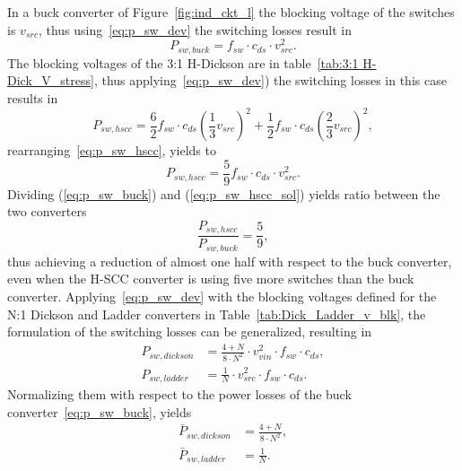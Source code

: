In a buck converter of Figure~\ref{fig:ind_ckt_l} the blocking voltage of the switches is $v_{src}$, thus using~\eqref{eq:p_sw_dev} the switching losses result in
\begin{equation}
P_{sw,buck} =   f_{sw} \cdot c_{ds} \cdot v_{src}^2.
\label{eq:p_sw_buck}
\end{equation}
The blocking voltages of the 3:1 H-Dickson are in table~\ref{tab:3:1 H-Dick_V_stress}, thus applying~\eqref{eq:p_sw_dev}) the switching losses in this case results in
\begin{equation}
P_{sw,hscc} =  \frac{6}{2}  f_{sw} \cdot c_{ds} \left( \frac{1}{3} v_{src} \right)^2 + \frac{1}{2}  f_{sw} \cdot c_{ds} \left( \frac{2}{3} v_{src} \right)^2 ,
\label{eq:p_sw_hscc}
\end{equation}
rearranging~\eqref{eq:p_sw_hscc},  yields to
\begin{equation}
P_{sw,hscc} =  \frac{5}{9}  f_{sw} \cdot c_{ds} \cdot v_{src}^2.
\label{eq:p_sw_hscc_sol}
\end{equation}
Dividing (\ref{eq:p_sw_buck}) and (\ref{eq:p_sw_hscc_sol}) yields ratio between the two converters
\begin{equation}
\frac{P_{sw,hscc}}{P_{sw,buck}} =  \frac{5}{9},
\label{eq:p_sw_rel}
\end{equation}
thus achieving a reduction of almost one half with respect to the buck converter, even when the H-SCC converter is using five more switches than the buck converter. Applying~\eqref{eq:p_sw_dev} with the blocking voltages defined for the N:1 Dickson and Ladder converters in Table~\ref{tab:Dick_Ladder_v_blk}, the formulation of the switching losses can be generalized, resulting in
\begin{align}
P_{sw,dickson} & =  \frac{4+N}{8 \cdot N^2} \cdot v_{vin}^2 \cdot f_{sw}  \cdot {c_{ds}} , \\
P_{sw,ladder}  & =  \frac{1}{ N} \cdot v_{src}^2 \cdot f_{sw} \cdot {c_{ds}}    .
\label{eq:p_sw_gen}
\end{align}
Normalizing them with respect to the power losses of the buck converter~\eqref{eq:p_sw_buck}, yields
\begin{align}
\bar{P}_{sw,dickson} & = \frac{4+N}{8 \cdot N^2} ,\label{eq:n_sw_dick}\\
\bar{P}_{sw,ladder} & = \frac{1}{ N}. \label{eq:n_sw_lddr}
\end{align}
